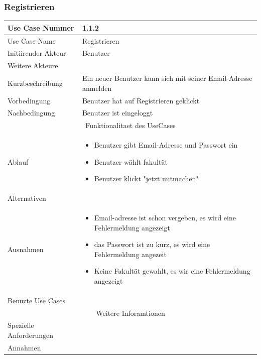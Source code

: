 \documentclass[10pt,a4paper]{article}
\begin{document}
	\subsubsection{Registrieren}
		\begin{tabular}{|l|p{.5\linewidth}|}
		\hline Use Case Nummer & 1.1.2 \\ 
		\hline Use Case Name & Registrieren \\ 
		\hline Initiirender Akteur & Benutzer \\
		\hline Weitere Akteure &  \\
		\hline Kurzbeschreibung & Ein neuer Benutzer kann sich mit seiner Email-Adresse anmelden \\
		\hline Vorbedingung & Benutzer hat auf Registrieren geklickt \\
		\hline Nachbedingung & Benutzer ist eingeloggt \\
		\hline \multicolumn{2}{|c|}{Funktionalitaet des UseCases}\\
		\hline Ablauf & \begin{itemize}
			\item Benutzer gibt Email-Adresse und Passwort ein
			\item Benutzer w\"ahlt fakult\"at
			\item Benutzer klickt "jetzt mitmachen"
		\end{itemize} \\
		\hline Alternativen &  \\
		\hline Ausnahmen & \begin{itemize}
			\item Email-adresse ist schon vergeben, es wird eine Fehlermeldung angezeigt
			\item das Passwort ist zu kurz, es wird eine Fehlermeldung angezeit
			\item Keine Fakult\"at gewahlt, es wir eine Fehlermeldung angezeigt
		\end{itemize} \\
		\hline Benuzte Use Cases &  \\
		\hline \multicolumn{2}{|c|}{Weitere Inforamtionen} \\
		\hline Spezielle Anforderungen &  \\
		\hline Annahmen &  \\
		\hline
		\end{tabular} 
		
\end{document}
